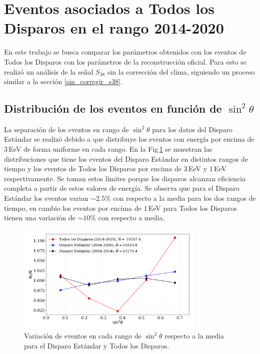 
\section{Eventos asociados a Todos los Disparos en el rango 2014-2020 }	\label{ALL_modulacion}
	

En este trabajo se busca comparar los parámetros obtenidos con los eventos de Todos los Disparos con los parámetros de la reconstrucción oficial. Para esto se realizó un análisis de la señal $S_{38}$ sin la corrección del clima, siguiendo un proceso similar a la sección \ref{sin_corregir_s38}.



\subsection{Distribución de los eventos en función de $\sin^2\theta$}

La separación de los eventos en rango de $\sin^2\theta$ para los datos del Disparo Estándar se realizó debido a que distribuye los eventos con energía por encima de $3\,$EeV de forma uniforme en cada rango. En la Fig\,\ref{fig:bin_eventos_sin_2_theta} se muestran las distribuciones que tiene los eventos del Disparo Estándar en distintos rangos de tiempo y los eventos de Todos los Disparos por encima de $3\,$EeV y $1\,$EeV respectivamente. Se toman estos límites porque los disparos alcanzan eficiencia completa a partir de estos valores de energía.  Se observa que para el Disparo Estándar los eventos varian $\sim 2.5\%$ con respecto a la media para los dos rangos de tiempo, en cambio los eventos por encima de $1\,$EeV para Todos los Disparos tienen una variación de $\sim 10\%$ con respecto a media.

\begin{figure}[H]
  \begin{small}
    \begin{center}
      \includegraphics[width=0.8\textwidth]{bin_eventos_sin_2_theta.pdf}
    \end{center}
    \caption{Variación de eventos en cada rango de $\sin^2\theta$ respecto a la media para el Disparo Estándar y Todos los Disparos. }
    \label{fig:bin_eventos_sin_2_theta}
  \end{small}
\end{figure}

